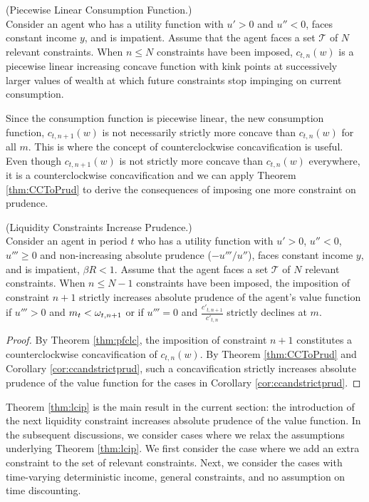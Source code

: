 \begin{corollary}(Piecewise Linear Consumption Function.) \\
	Consider an agent who has a utility function with $u'> 0$ and $u'' < 0$, faces constant income ${y}$, and is impatient. Assume that the agent faces a set $\mathcal{T}$ of $N$ relevant constraints. When $n \leq N$ constraints have been imposed, $c_{t,n}(w)$ is a piecewise linear increasing concave function with kink points at successively larger values of wealth at which future constraints stop impinging on current consumption.
\end{corollary}

Since the consumption function is piecewise linear, the new consumption function, $c_{t,n+1}(w)$ is not necessarily strictly more concave than $c_{t,n}(w)$ for all ${m}$. This is where the concept of counterclockwise concavification is useful. Even though $c_{t,n+1}(w)$ is not strictly more concave than $c_{t,n}(w)$ everywhere, it is a counterclockwise concavification and we can apply Theorem \ref{thm:CCToPrud} to derive the consequences of imposing one more constraint on prudence.

\begin{theorem}\label{thm:lcip} (Liquidity Constraints Increase Prudence.) \\
	Consider an agent in period $t$ who has a utility function with $u' > 0$, $u'' < 0$, $u''' \geq 0$ and non-increasing absolute prudence ($-u'''/u''$), faces constant income ${y}$, and is impatient, $\beta R < 1$. Assume that the agent faces a set $\mathcal{T}$ of $N$ relevant constraints. When $n \leq N-1$ constraints have been imposed, the imposition of constraint $n+1$ strictly increases absolute prudence of the agent's value function if $u''' > 0$ and ${m}_{t} < \omega_{t,n+1}$ or if $u''' = 0$ and $\frac{c'_{t,n+1}}{c'_{t,n}}$ strictly declines at ${m}$.
\end{theorem}
\begin{proof}
	By Theorem \ref{thm:pfclc}, the imposition of constraint $n+1$ constitutes a counterclockwise concavification of $c_{t,n}(w)$. By Theorem \ref{thm:CCToPrud} and Corollary \ref{cor:ccandstrictprud}, such a concavification strictly increases absolute prudence of the value function for the cases in Corollary \ref{cor:ccandstrictprud}.
\end{proof}

Theorem \ref{thm:lcip} is the main result in the current section: the introduction of the next liquidity constraint increases absolute prudence of the value function. In the subsequent discussions, we consider cases where we relax the assumptions underlying Theorem \ref{thm:lcip}. We first consider the case where we add an extra constraint to the set of relevant constraints. Next, we consider the cases with time-varying deterministic income, general constraints, and no assumption on time discounting.






